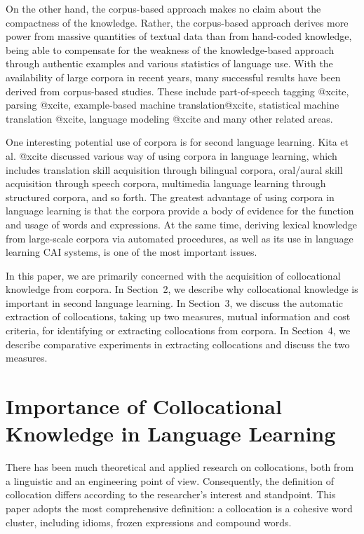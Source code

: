 On the other hand,
the corpus-based approach makes no claim about the compactness
of the knowledge.
Rather, the corpus-based approach derives more power
from massive quantities of textual data than from hand-coded knowledge,
being able to compensate for the weakness of the knowledge-based approach
through authentic examples and various statistics of language use.
With the availability of large corpora in recent years,
many successful results have been derived from corpus-based studies.
These include part-of-speech tagging @xcite,
parsing @xcite,
example-based machine translation@xcite,
statistical machine translation @xcite,
language modeling @xcite
and many other related areas.

One interesting potential use of corpora
is for second language learning.
Kita et al. @xcite discussed various way of using corpora
in language learning,
which includes translation skill acquisition through bilingual corpora,
oral/aural skill acquisition through speech corpora,
multimedia language learning through structured corpora, and so forth.
The greatest advantage of using corpora in language learning is that
the corpora provide a body of evidence for the function and usage of words
and expressions.
At the same time,
deriving lexical knowledge
from large-scale corpora via automated procedures,
as well as its use in language learning CAI systems,
is one of the most important issues.

In this paper, we are primarily concerned with the acquisition
of collocational knowledge from corpora.
In Section~2, we describe why collocational knowledge is
important in second language learning.
In Section~3, we discuss the automatic extraction of collocations,
taking up two measures, mutual information and cost criteria,
for identifying or extracting collocations from corpora.
In Section~4, we describe comparative experiments in extracting collocations
and discuss the two measures.


\section{Importance of Collocational Knowledge in Language Learning}

There has been much theoretical and applied research
on collocations,
both from a linguistic and an engineering point of view.
Consequently, the definition of collocation differs according to
the researcher's interest and standpoint.
This paper adopts the most comprehensive definition:
a collocation is a cohesive word cluster,
including idioms, frozen expressions and compound words.

